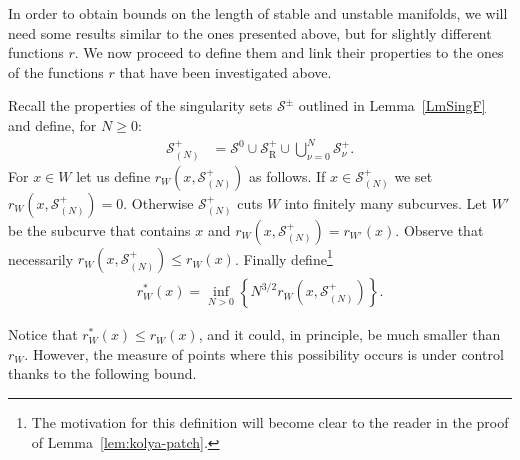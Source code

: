 \documentclass[10pt]{amsart}
\theoremstyle{definition}\newtheorem{defi}[theo]{Definition}\newtheorem{rema}[theo]{Remark}\newtheorem{exam}[theo]{Example}\newtheorem{exem}[theo]{Example}\newtheorem{nota}[theo]{Notation}
\newcommand{\recoPrivate}{\mathrm{R}}
\newcommand{\singPrivate}{\mathcal{S}}
\newcommand{\sing}[1]{\singPrivate^{#1}}
\newcommand{\singBoth}{\singPrivate^\pm}
\newcommand{\singForward}[1]{\singPrivate^+_{#1}}
\newcommand{\indCell}{\nu}
\begin{document}
In order to obtain bounds on the length of stable and unstable manifolds, we will need some results similar to the ones presented above, but for slightly different functions $r$. We now proceed to define them and link their properties to the ones of the functions $r$ that have been investigated above.

Recall the properties of the singularity sets $\singBoth$ outlined in Lemma~\ref{LmSingF} and define, for $N \ge 0$:
\begin{align*}
\singForward{(N)} &= \sing{0}\cup\singForward\recoPrivate\cup\bigcup_{\indCell = 0}^{N}\singForward{\indCell}.
\end{align*}
For $x\in W$ let us define $r_W(x,\singForward{(N)})$ as follows. If $x\in\singForward{(N)}$ we set $r_W(x,\singForward{(N)}) = 0$. Otherwise $\singForward{(N)}$ cuts $W$ into finitely many subcurves. Let $W'$ be the subcurve that contains $x$ and $r_W(x,\singForward{(N)}) = r_{W'}(x)$. Observe that necessarily $r_{W}(x,\singForward{(N)})\le r_{W}(x)$. Finally define\footnote{ The motivation for this definition will become clear to the reader in the proof of Lemma~\ref{lem:kolya-patch}.}
\begin{align*}
r_{W}^{*}(x) = \inf_{N > 0}\left\{N^{3/2}r_{W}\left(x,\singForward{(N)}\right)\right\}.
\end{align*}

Notice that $r^{*}_{W}(x)\le r_{W}(x)$, and it could, in principle, be much smaller than $r_{W}$. However, the measure of points where this possibility occurs is under control thanks to the following bound.
\end{document}
